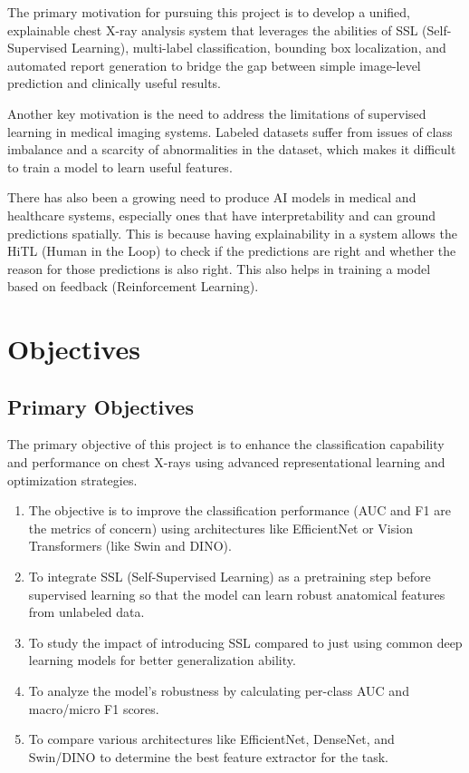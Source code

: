 The primary motivation for pursuing this project is to develop a unified, explainable chest X-ray analysis system that leverages the abilities of SSL (Self-Supervised Learning), multi-label classification, bounding box localization, and automated report generation to bridge the gap between simple image-level prediction and clinically useful results.

Another key motivation is the need to address the limitations of supervised learning in medical imaging systems. Labeled datasets suffer from issues of class imbalance and a scarcity of abnormalities in the dataset, which makes it difficult to train a model to learn useful features.

There has also been a growing need to produce AI models in medical and healthcare systems, especially ones that have interpretability and can ground predictions spatially. This is because having explainability in a system allows the HiTL (Human in the Loop) to check if the predictions are right and whether the reason for those predictions is also right. This also helps in training a model based on feedback (Reinforcement Learning).

\section{Objectives}
\subsection{Primary Objectives}
The primary objective of this project is to enhance the classification capability and performance on chest X-rays using advanced representational learning and optimization strategies.
\begin{enumerate}
\item The objective is to improve the classification performance (AUC and F1 are the metrics of concern) using architectures like EfficientNet or Vision Transformers (like Swin and DINO).
\item To integrate SSL (Self-Supervised Learning) as a pretraining step before supervised learning so that the model can learn robust anatomical features from unlabeled data.
\item To study the impact of introducing SSL compared to just using common deep learning models for better generalization ability.
\item To analyze the model's robustness by calculating per-class AUC and macro/micro F1 scores.
\item To compare various architectures like EfficientNet, DenseNet, and Swin/DINO to determine the best feature extractor for the task.
\end{enumerate}
